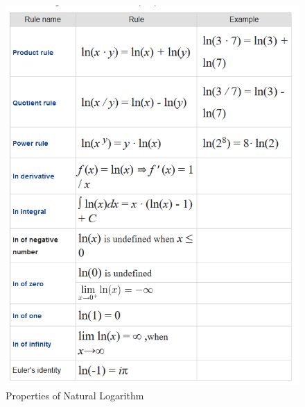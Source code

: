 \documentclass[12pt,twoside]{article}
\begin{document}
\begin{figure}[h!]
    \centering
    \includegraphics[scale=.8]{ln_properties.png}
    \caption{Properties of Natural Logarithm}
    \label{Ln properties}
\end{figure}
\end{document}
